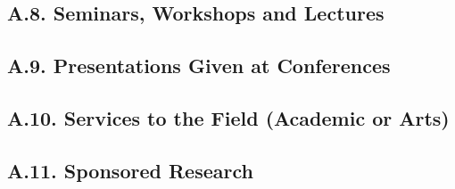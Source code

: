 \documentclass[10pt]{article}
\newcommand{\junk}[1]{}
\begin{document}
\junk{
\subsection*{A.7. Patents}



}

\subsection*{A.8. Seminars, Workshops and Lectures}





\subsection*{A.9. Presentations Given at Conferences}





\subsection*{A.10. Services to the Field (Academic or Arts)}


\subsection*{A.11. Sponsored Research}

\end{document}
